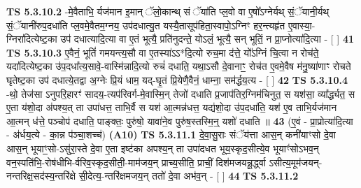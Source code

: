 \documentclass[17pt]{extarticle}
\begin{document}
                  \newline
                                \textbf{ TS 5.3.10.2} \newline
                  -मे॒वैताभि॒ र्यज॑मान इ॒मान् ॅलो॒कान्थ् सं ॅया॑ति प्ल॒वो वा ए॒षो᳚ऽग्नेर्यथ् सं॒ॅयानी॒र्यथ् सं॒ॅयानी॑रुप॒दधा॑ति प्ल॒वमे॒वैतम॒ग्नय॒ उप॑दधात्यु॒त यस्यै॒तासूप॑हिता॒स्वापो॒ऽग्निꣳ हर॒न्त्यहृ॑त ए॒वास्या॒-ग्निरा॑दित्येष्ट॒का उप॑ दधात्यादि॒त्या वा ए॒तं भूत्यै॒ प्रति॑नुदन्ते॒ योऽलं॒ भूत्यै॒ सन् भूतिं॒ न प्रा॒प्नोत्या॑दि॒त्या - [  ] \textbf{  41} \newline
                  \newline
                                \textbf{ TS 5.3.10.3} \newline
                  ए॒वैनं॒ भूतिं॑ गमयन्त्य॒सौ वा ए॒तस्या॑ऽऽ*दि॒त्यो रुच॒मा द॑त्ते॒ यो᳚ऽग्निं चि॒त्वा न रोच॑ते॒ यदा॑दित्येष्ट॒का उ॑प॒दधा᳚त्य॒सावे॒-वास्मि॑न्नादि॒त्यो रुचं॑ दधाति॒ यथा॒ऽसौ दे॒वानाꣳ॒॒ रोच॑त ए॒वमे॒वैष म॑नु॒ष्या॑णाꣳ रोचते घृतेष्ट॒का उप॑ दधात्ये॒तद्वा अ॒ग्नेः प्रि॒यं धाम॒ यद्-घृ॒तं प्रि॒येणै॒वैनं॒ धाम्ना॒ सम॑र्द्धय॒त्य - [  ] \textbf{  42} \newline
                  \newline
                                \textbf{ TS 5.3.10.4} \newline
                  -थो॒ तेज॑सा ऽनुपरि॒हारꣳ॑ सादय॒-त्यप॑रिवर्ग-मे॒वास्मि॒न् तेजो॑ दधाति प्र॒जाप॑तिर॒ग्निम॑चिनुत॒ स यश॑सा॒ व्या᳚र्द्ध्यत॒ स ए॒ता य॑शो॒दा अ॑पश्य॒त् ता उपा॑धत्त॒ ताभि॒र्वै स यश॑ आ॒त्मन्न॑धत्त॒ यद्य॑शो॒दा उ॑प॒दधा॑ति॒ यश॑ ए॒व ताभि॒र्यज॑मान आ॒त्मन् ध॑त्ते॒ पञ्चोप॑ दधाति॒ पाङ्क्तः॒ पुरु॑षो॒ यावा॑ने॒व पुरु॑ष॒स्तस्मि॒न्॒ यशो॑ दधाति ॥ \textbf{  43} \newline
                  \newline
                      (ए॒वं - प्रा॒प्रोत्या॑दि॒त्या - अ॑र्धय॒त्ये - का॒न्न प॑ञ्चा॒शच्च॑)  \textbf{(A10)} \newline \newline
                                        \textbf{ TS 5.3.11.1} \newline
                  दे॒वा॒सु॒राः संॅय॑त्ता आस॒न् कनी॑याꣳसो दे॒वा आस॒न् भूयाꣳ॒॒सो-ऽसु॑रा॒स्ते दे॒वा ए॒ता इष्ट॑का अपश्य॒न् ता उपा॑दधत भूय॒स्कृद॒सीत्ये॒व भूयाꣳ॑सोऽभव॒न् वन॒स्पति॑भि॒-रोष॑धीभि-र्वरिव॒स्कृद॒सीती॒-माम॑जय॒न् प्राच्य॒सीति॒ प्राचीं॒ दिश॑मजयन्नू॒र्द्ध्वा ऽसीत्य॒मूम॑जयन्-नन्तरिक्ष॒सद॑स्य॒न्तरि॑क्षे सी॒देत्य॒-न्तरि॑क्षमजय॒न् ततो॑ दे॒वा अभ॑व॒न् - [  ] \textbf{  44} \newline
                  \newline
                                \textbf{ TS 5.3.11.2} \newline
\end{document}
